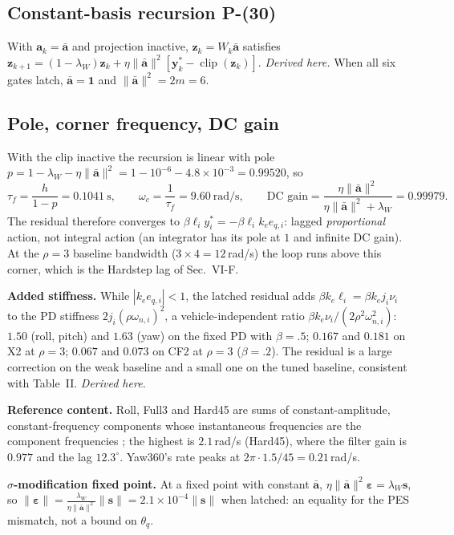 \documentclass[11pt]{article}
\newcommand{\srcroot}{../..}
\newcommand{\clip}{\operatorname{clip}}
\newcommand{\Peq}[1]{P-(#1)}
\theoremstyle{remark}
\newcommand{\listing}[4]{%
  \Needspace{8\baselineskip}%
  }
\begin{document}
\subsection{Constant-basis recursion \Peq{30}}
With $\bm a_k=\bar{\bm a}$ and projection inactive, $\bm z_k=W_k\bar{\bm a}$ satisfies
$\bm z_{k+1}=(1-\lambda_W)\bm z_k+\eta\|\bar{\bm a}\|^2[\bm y_k^*-\clip(\bm z_k)]$. \emph{Derived here.} When all six gates latch,
$\bar{\bm a}=\bm1$ and $\|\bar{\bm a}\|^2=2m=6$.

\subsection{Pole, corner frequency, DC gain}
With the clip inactive the recursion is linear with pole $p=1-\lambda_W-\eta\|\bar{\bm a}\|^2=1-10^{-6}-4.8\times10^{-3}=0.99520$, so
\[
\tau_f=\frac{h}{1-p}=0.1041\ \text{s},\qquad \omega_c=\frac1{\tau_f}=9.60\ \text{rad/s},\qquad
\text{DC gain}=\frac{\eta\|\bar{\bm a}\|^2}{\eta\|\bar{\bm a}\|^2+\lambda_W}=0.99979 .
\]
The residual therefore converges to $\beta\ell_iy_i^*=-\beta\ell_ik_e e_{q,i}$: lagged \emph{proportional} action, not integral action
(an integrator has its pole at $1$ and infinite DC gain). At the $\rho=3$ baseline bandwidth ($3\times4=12$\,rad/s) the loop runs
above this corner, which is the Hardstep lag of Sec.~VI-F.
\listing{experiments/theory_certificate_2026-09-12/compute_local_certificate.py}{148}{161}{pole, time constant, corner, DC gain, lag, stiffness ratio}

\textbf{Added stiffness.} While $|k_ee_{q,i}|<1$, the latched residual adds $\beta k_e\ell_i=\beta k_ej_i\nu_i$ to the PD stiffness
$2j_i(\rho\omega_{n,i})^2$, a vehicle-independent ratio $\beta k_e\nu_i/(2\rho^2\omega_{n,i}^2)$: $1.50$ (roll, pitch) and $1.63$ (yaw) on
the fixed PD with $\beta=.5$; $0.167$ and $0.181$ on X2 at $\rho=3$; $0.067$ and $0.073$ on CF2 at $\rho=3$ ($\beta=.2$). The residual is
a large correction on the weak baseline and a small one on the tuned baseline, consistent with Table~II. \emph{Derived here.}

\textbf{Reference content.} Roll, Full3 and Hard45 are sums of constant-amplitude, constant-frequency components whose
instantaneous frequencies are the component frequencies \cite{sandoval2018instantaneous}; the highest is $2.1$\,rad/s
(Hard45), where the filter gain is $0.977$ and the lag $12.3^\circ$. Yaw360's rate peaks at $2\pi\cdot1.5/45=0.21$\,rad/s.

\textbf{$\sigma$-modification fixed point.} At a fixed point with constant $\bar{\bm a}$, $\eta\|\bar{\bm a}\|^2\bm\varepsilon=\lambda_W\bm s$, so
$\|\bm\varepsilon\|=\frac{\lambda_W}{\eta\|\bar{\bm a}\|^2}\|\bm s\|=2.1\times10^{-4}\|\bm s\|$ when latched: an equality for the PES mismatch,
not a bound on $\theta_q$.
\end{document}
